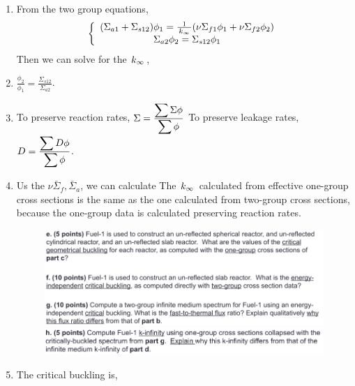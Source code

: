 \documentclass{school-22.211-notes}
\begin{document}
\begin{enumerate}
\begin{enumerate}
\item From the two group equations, 
  \begin{align}
    \left\{ \begin{array}{c}
      (\Sigma_{a1} + \Sigma_{s12} ) \phi_1 = \frac{1}{\left. k_{\infty} \right.} ( \nu \Sigma_{f1} \phi_1 + \nu \Sigma_{f2} \phi_2 )   \\
      \Sigma_{a2} \phi_2 = \Sigma_{s12} \phi_1
    \end{array} \right. 
  \end{align}
Then we can solve for the $\left. k_{\infty} \right.$,

\item $\frac{\phi_2}{\phi_1} = \frac{\Sigma_{s12}}{\Sigma_{a2}}$. 

\item To preserve reaction rates, $ \Sigma = \frac{\displaystyle\sum \Sigma \phi}{\displaystyle\sum \phi}$
  To preserve leakage rates, $D = \frac{\displaystyle\sum D \phi}{\displaystyle\sum \phi}$.
 
\item Us the $\nu \bar{\Sigma}_f, \bar{\Sigma}_a$, we can calculate
  The $\left. k_{\infty} \right.$ calculated from effective one-group cross sections is the same as the one calculated from two-group cross sections, because the one-group data is calculated preserving reaction rates. 

\clearpage
\begin{figure}[ht]
  \includegraphics[width=6in]{images/qual/quiz-1.png} 
  \\
  \includegraphics[width=6in]{images/qual/quiz-2.png}
\end{figure}
\item The critical buckling is, 


\end{enumerate}
\end{enumerate}
\end{document}
